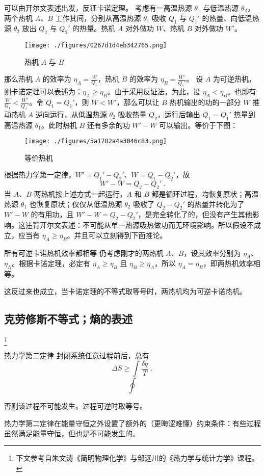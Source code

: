 可以由开尔文表述出发，反证卡诺定理。
考虑有一高温热源 $\theta_1$ 与低温热源 $\theta_2$，两个热机 $A$、$B$ 工作其间，分别从高温热源 $\theta_1$ 吸收 $Q_1$ 与 $Q_1'$ 的热量、向低温热源 $\theta_2$ 放出 $Q_2$ 与 $Q_2'$ 的热量。热机 $A$ 对外做功 $W$、热机 $B$ 对外做功 $W'$。
\begin{figure}[ht]
\centering
\texttt{[image: ./figures/0267d1d4eb342765.png]}
\caption{热机 $A$ 与 $B$} \label{fig_Td2Law_8}
\end{figure}
那么热机 $A$ 的效率为 $\eta_A = \frac{W}{Q_1}$，热机 $B$ 的效率为 $\eta_B = \frac{W'}{Q_1'}$。
设 $A$ 为可逆热机，则卡诺定理可以表述为：$\eta_A \ge \eta_B$。由于采用反证法，为此，设 $\eta_A < \eta_B$。也即有 $\frac{W}{Q_1}<\frac{W'}{Q_1'}$。令 $Q_1=Q_1'$，则 $W<W'$，那么可以让 $B$ 热机输出的功的一部分 $W$ 推动热机 $A$ 逆向运行，从低温热源 $\theta_2$ 吸收热量 $Q_2$，运行后输出 $Q_1=Q_1'$ 热量到高温热源 $\theta_1$。此时热机 $B$ 还有多余的功 $W'-W$ 可以输出。等价于下图：
\begin{figure}[ht]
\centering
\texttt{[image: ./figures/5a1782a4a3046c83.png]}
\caption{等价热机} \label{fig_Td2Law_9}
\end{figure}
根据热力学第一定律，$W'=Q_1'-Q_2'$、$W=Q_1-Q_2'$，故
$$W'-W=Q_2-Q_2' ~.$$
当 $A$、$B$ 两热机按上述方式一起运行，$A$ 和 $B$ 都是循环过程，均恢复原状；高温热源 $\theta_1$ 也恢复原状；仅仅从低温热源 $\theta_2$ 吸收了 $Q_2-Q_2'$ 的热量并转化为了 $W'-W$ 的有用功，且 $W'-W=Q_2-Q_2'$，是完全转化了的，但没有产生其他影响。这违背开尔文表述：不可能从单一热源吸热做功而无环境影响。所以假设不成立，应当有 $\eta_A \ge \eta_B$。并且可以立刻得到下面推论。
\begin{corollary}{所有可逆卡诺热机效率都相等}
仍考虑刚才的两热机 $A$、$B$，设其效率分别为 $\eta_A$、$\eta_B$。根据卡诺定理，必定有 $\eta_A \ge \eta_B$ 且 $\eta_B \ge \eta_A$，所以 $\eta_A = \eta_B$，即两热机效率相等。
\end{corollary}
这反过来也成立，当卡诺定理的不等式取等号时，两热机均为可逆卡诺热机。

\subsection{克劳修斯不等式；熵的表述}\label{sub_Td2Law_3}
\footnote{下文参考自朱文涛《简明物理化学》与邹远川的《热力学与统计力学》课程。}

\begin{theorem}{热力学第二定律}
封闭系统任意过程前后，总有
\begin{equation}
\Delta S \ge \int \frac{\delta q}{T}~,
\end{equation}
\begin{equation}
\oint 
\end{equation}

否则该过程不可能发生。过程可逆时取等号。
\end{theorem}
热力学第二定律在能量守恒之外设置了额外的（更晦涩难懂）约束条件：有些过程虽然满足能量守恒，但也是不可能发生的。


